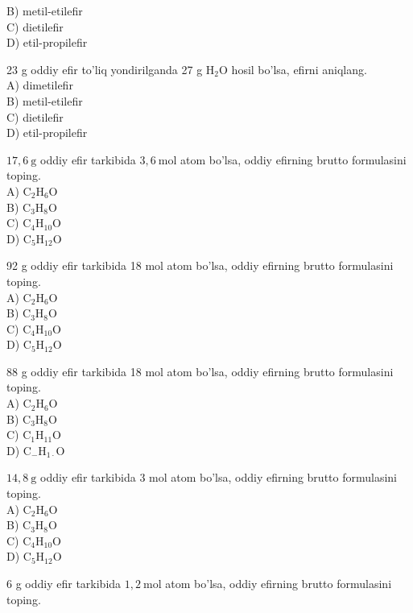 B) metil-etilefir\\
C) dietilefir\\
D) etil-propilefir
  \item 23 g oddiy efir to'liq yondirilganda 27 g $\mathrm{H}_{2} \mathrm{O}$ hosil bo'lsa, efirni aniqlang.\\
A) dimetilefir\\
B) metil-etilefir\\
C) dietilefir\\
D) etil-propilefir
  \item $17,6 \mathrm{~g}$ oddiy efir tarkibida $3,6 \mathrm{~mol}$ atom bo'lsa, oddiy efirning brutto formulasini toping.\\
A) $\mathrm{C}_{2} \mathrm{H}_{6} \mathrm{O}$\\
B) $\mathrm{C}_{3} \mathrm{H}_{8} \mathrm{O}$\\
C) $\mathrm{C}_{4} \mathrm{H}_{10} \mathrm{O}$\\
D) $\mathrm{C}_{5} \mathrm{H}_{12} \mathrm{O}$
  \item 92 g oddiy efir tarkibida 18 mol atom bo'lsa, oddiy efirning brutto formulasini toping.\\
A) $\mathrm{C}_{2} \mathrm{H}_{6} \mathrm{O}$\\
B) $\mathrm{C}_{3} \mathrm{H}_{8} \mathrm{O}$\\
C) $\mathrm{C}_{4} \mathrm{H}_{10} \mathrm{O}$\\
D) $\mathrm{C}_{5} \mathrm{H}_{12} \mathrm{O}$
  \item 88 g oddiy efir tarkibida 18 mol atom bo'lsa, oddiy efirning brutto formulasini toping.\\
A) $\mathrm{C}_{2} \mathrm{H}_{6} \mathrm{O}$\\
B) $\mathrm{C}_{3} \mathrm{H}_{8} \mathrm{O}$\\
C) $\mathrm{C}_{1} \mathrm{H}_{11} \mathrm{O}$\\
D) $\mathrm{C}_{-} \mathrm{H}_{1 \cdot} \mathrm{O}$
  \item $14,8 \mathrm{~g}$ oddiy efir tarkibida 3 mol atom bo'lsa, oddiy efirning brutto formulasini toping.\\
A) $\mathrm{C}_{2} \mathrm{H}_{6} \mathrm{O}$\\
B) $\mathrm{C}_{3} \mathrm{H}_{8} \mathrm{O}$\\
C) $\mathrm{C}_{4} \mathrm{H}_{10} \mathrm{O}$\\
D) $\mathrm{C}_{5} \mathrm{H}_{12} \mathrm{O}$
  \item 6 g oddiy efir tarkibida $1,2 \mathrm{~mol}$ atom bo'lsa, oddiy efirning brutto formulasini toping.\\
